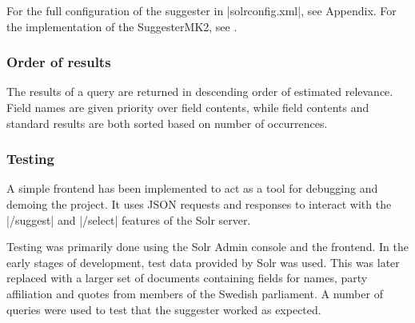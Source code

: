 For the full configuration of the suggester in |solrconfig.xml|, see Appendix.
For the implementation of the SuggesterMK2, see \cite{GITHUBPROJ}.

\subsubsection{Order of results}

The results of a query are returned in descending order of estimated relevance. Field names are given priority over field contents, while field contents and standard results are both sorted based on number of occurrences.

\subsubsection{Testing}

A simple frontend has been implemented to act as a tool for debugging and demoing the project. It uses JSON requests and responses to interact with the |/suggest| and |/select| features of the Solr server.

Testing was primarily done using the Solr Admin console and the frontend.
In the early stages of development, test data provided by Solr was used. This was later replaced with a larger set of documents containing fields for names, party affiliation and quotes from members of the Swedish parliament. A number of queries were used to test that the suggester worked as expected.
